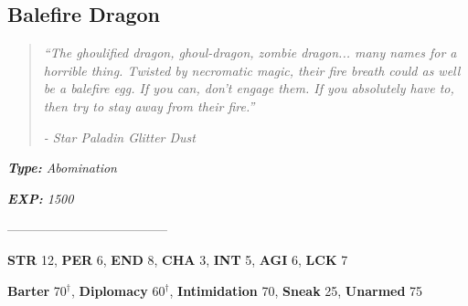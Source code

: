 \documentclass[11pt,a4paper,twocolumn]{book}
\begin{document}
	\clearpage
	
	\subsection*{Balefire Dragon}	
	\begin{quote}
		\emph{``The ghoulified dragon, ghoul-dragon, zombie dragon... many names for a horrible thing. Twisted by necromatic magic, their fire breath could as well be a balefire egg. If you can, don't engage them. If you absolutely have to, then try to stay away from their fire.''}
		
		\emph{-	Star Paladin Glitter Dust}
	\end{quote}
	
	\noindent
	\emph{\textbf{Type:} Abomination}
	
	\noindent
	\emph{\textbf{EXP:} 1500}
	
%		
%	
%		

	--------------------------------------

	\noindent
	\textbf{STR} 12, \textbf{PER} 6, \textbf{END} 8, \textbf{CHA} 3, \textbf{INT} 5, \textbf{AGI} 6, \textbf{LCK} 7
	
	\noindent
	\textbf{Barter} 70$^{\dag}$, \textbf{Diplomacy} 60$^{\dag}$, \textbf{Intimidation} 70, \textbf{Sneak} 25, \textbf{Unarmed} 75
	
\end{document}
